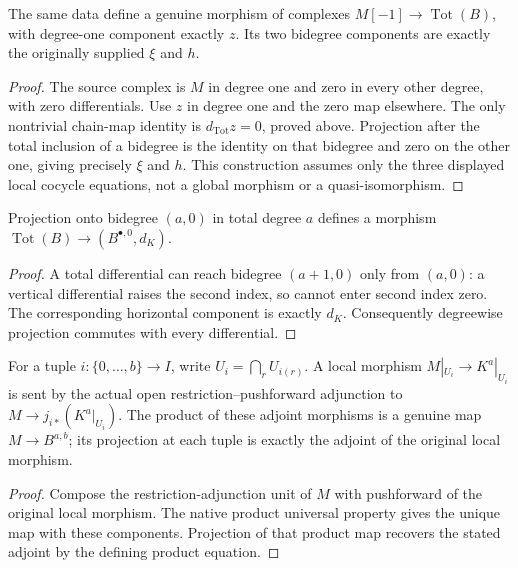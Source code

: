 \begin{theorem}
\label{thm:di-cech-degree-one-descent-map}
\leanok
{}
The same data define a genuine morphism of complexes
$M[-1]\to\operatorname{Tot}(B)$, with degree-one component exactly $z$.
Its two bidegree components are exactly the originally supplied $\xi$ and $h$.
\end{theorem}
\begin{proof}
\leanok
The source complex is $M$ in degree one and zero in every other degree,
with zero differentials. Use $z$ in degree one and the zero map elsewhere.
The only nontrivial chain-map identity is $d_{\mathrm{Tot}}z=0$, proved
above. Projection after the total inclusion of a bidegree is the identity
on that bidegree and zero on the other one, giving precisely $\xi$ and $h$.
This construction assumes only the three displayed local cocycle equations,
not a global morphism or a quasi-isomorphism.
\end{proof}

\begin{lemma}
\label{lem:di-cech-total-zero-row-projection}
\leanok
{}
Projection onto bidegree $(a,0)$ in total degree $a$ defines a morphism
$\operatorname{Tot}(B)\to(B^{\bullet,0},d_K)$.
\end{lemma}
\begin{proof}
\leanok
A total differential can reach bidegree $(a+1,0)$ only from $(a,0)$:
a vertical differential raises the second index, so cannot enter second
index zero. The corresponding horizontal component is exactly $d_K$.
Consequently degreewise projection commutes with every differential.
\end{proof}

\begin{definition}
\label{def:di-cech-original-local-cochains}
\leanok
{}
For a tuple $i:\{0,\ldots,b\}\to I$, write $U_i=\bigcap_r U_{i(r)}$.
A local morphism $M|_{U_i}\to K^a|_{U_i}$ is sent by the actual open
restriction--pushforward adjunction to
$M\to j_{i*}(K^a|_{U_i})$. The product of these adjoint morphisms is a
genuine map $M\to B^{a,b}$; its projection at each tuple is exactly the
adjoint of the original local morphism.
\end{definition}
\begin{proof}
\leanok
Compose the restriction-adjunction unit of $M$ with pushforward of the
original local morphism. The native product universal property gives
the unique map with these components. Projection of that product map
recovers the stated adjoint by the defining product equation.
\end{proof}

